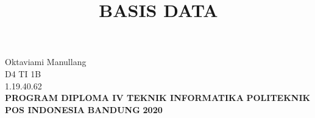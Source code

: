 \documentclass{article}
\begin{document}
\title{\huge\textbf{BASIS DATA}}
\date{}


\maketitle


\begin{center}
\vspace{4cm}
Oktaviami Manullang\\
D4 TI 1B\\
1.19.40.62\\
\vspace{4CM}
\textbf{PROGRAM DIPLOMA IV TEKNIK INFORMATIKA} \linebreak
\textbf{POLITEKNIK POS INDONESIA} \linebreak
\textbf{BANDUNG} \linebreak
\textbf{2020}\\

\end{center}
\newpage
\end{document}
